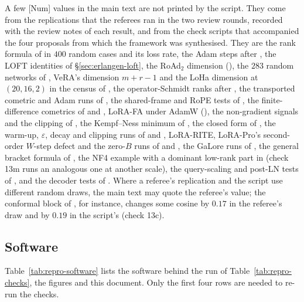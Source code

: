 A few [Num] values in the main text are not printed by the script. They come from the replications that the referees ran
in the two review rounds, recorded with the review notes of each result, and from the check scripts that accompanied
the four proposals from which the framework was synthesised. They are the rank formula of  in
$400$ random cases and its loss rate, the Adam steps after , the LOFT identities of \S\ref{sec:erlangen-loft}, the
RoAd$_2$ dimension (), the $283$ random networks of , VeRA's dimension
$m+r-1$ and the LoHa dimension at $(20,16,2)$ in the census of , the operator-Schmidt ranks
after , the transported cometric and Adam runs of , the shared-frame
and RoPE tests of , the finite-difference cometrics of  and
, LoRA-FA under AdamW (), the non-gradient signals and the clipping of
, the Kempf--Ness minimum of , the closed form of
, the warm-up, $\varepsilon$, decay and clipping runs of  and
, LoRA-RITE, LoRA-Pro's second-order $W$-step defect and the zero-$B$ runs of  and ,
the GaLore runs of , the general bracket formula of , the NF4
example with a dominant low-rank part in  (check 13m runs an analogous one at another scale),
the query-scaling and post-LN tests of , and the decoder tests of . Where a
referee's replication and the script use different random draws, the main text may quote the referee's value; the
conformal block of , for instance, changes some cosine by $0.17$ in the referee's draw and by
$0.19$ in the script's (check 13c).

\subsection{Software}\label{app:repro-software}

Table~\ref{tab:repro-software} lists the software behind the run of Table~\ref{tab:repro-checks}, the figures and this
document. Only the first four rows are needed to re-run the checks.

